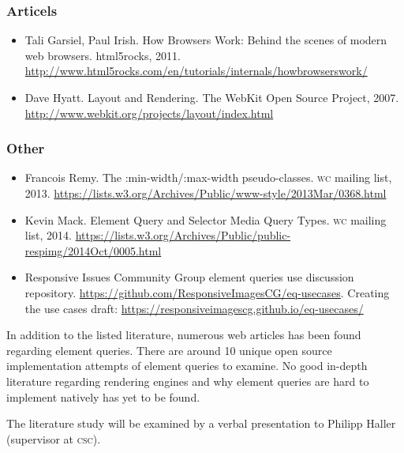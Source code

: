 \documentclass[oneside,a4paper,11pt]{kth-mag}
\begin{document}
\subsubsection*{Articels}
\begin{itemize}
\item Tali Garsiel, Paul Irish. How Browsers Work: Behind the scenes of modern web browsers. html5rocks, 2011. \url{http://www.html5rocks.com/en/tutorials/internals/howbrowserswork/}
\item Dave Hyatt. Layout and Rendering. The WebKit Open Source Project, 2007. \url{http://www.webkit.org/projects/layout/index.html}
\end{itemize}

\subsubsection{Other}
\begin{itemize}
\item Francois Remy. The :min-width/:max-width pseudo-classes. \textsc{w}\textsc{c} mailing list, 2013. \url{https://lists.w3.org/Archives/Public/www-style/2013Mar/0368.html}
\item Kevin Mack. Element Query and Selector Media Query Types. \textsc{w}\textsc{c} mailing list, 2014. \url{https://lists.w3.org/Archives/Public/public-respimg/2014Oct/0005.html}
\item Responsive Issues Community Group element queries use discussion repository. \url{https://github.com/ResponsiveImagesCG/eq-usecases}. Creating the use cases draft: \url{https://responsiveimagescg.github.io/eq-usecases/}
\end{itemize}

In addition to the listed literature, numerous web articles has been found regarding element queries. There are around 10 unique open source implementation attempts of element queries to examine. No good in-depth literature regarding rendering engines and why element queries are hard to implement natively has yet to be found.

The literature study will be examined by a verbal presentation to Philipp Haller (supervisor at \textsc{csc}).
\end{document}
